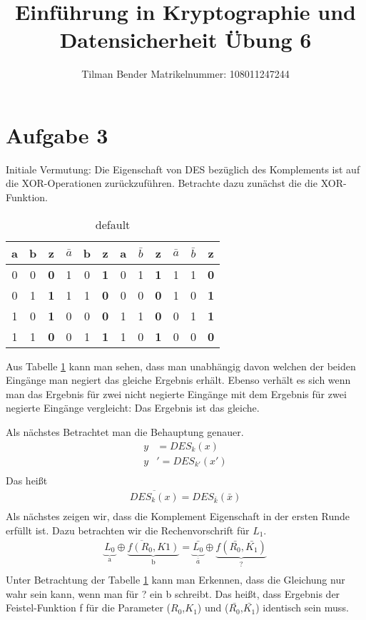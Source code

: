 \documentclass[10pt,a4paper,parskip]{scrartcl}
\author{Tilman Bender   Matrikelnummer: 108011247244\\}
\title{Einführung in Kryptographie und Datensicherheit Übung 6}
\begin{document}
\maketitle

\section*{Aufgabe 3}
Initiale Vermutung: Die Eigenschaft von DES bezüglich des Komplements ist auf die XOR-Operationen zurückzuführen. Betrachte dazu zunächst die  die XOR-Funktion.
\begin{table}[htdp]
\caption{default}
\begin{center}
\begin{tabular}{|c|c|c||c|c|c||c|c|c||c|c|c||}
	a & b & z & $\bar{a}$ & b & z & a & $\bar{b}$ & z & $\bar{a}$ & $\bar{b}$ & z\\ \hline
	0 & 0 & \textbf{0} & 	1 	 & 0 & \textbf{1}  & 0 & 1		  & \textbf{1} & 1		     &	1		& \textbf{0} \\
	0 & 1 & \textbf{1} &	1	& 1 &   \textbf{0} & 0 &	0	    &	 \textbf{0} & 1		     & 0		& \textbf{1}\\	
	1 & 0 & \textbf{1} &	0	& 0 &   \textbf{0} & 1 &	1	    &	 \textbf{0} & 0		     & 1		& \textbf{1}\\	
	1 & 1 & \textbf{0} &	0	& 1 &   \textbf{1} & 1 &	0	    &	 \textbf{1} & 0		     & 0		& \textbf{0}\\	
\end{tabular}
\end{center}
\label{tbl:xor}
\end{table}%
Aus Tabelle \ref{tbl:xor} kann man sehen, dass man unabhängig davon welchen der beiden Eingänge man negiert das gleiche Ergebnis erhält. Ebenso verhält es sich wenn man das Ergebnis für zwei nicht negierte Eingänge mit dem Ergebnis für zwei negierte Eingänge vergleicht: Das Ergebnis ist das gleiche.

Als nächstes Betrachtet man die Behauptung genauer.
\begin{align*}
y&=DES_{k}(x)\\
y&'=DES_{k'}(x')\\
\end{align*}
Das heißt
\begin{align*}
\overline{DES_{k}(x)}=DES_{\bar{k}}(\bar{x})\\
\end{align*}
Als nächstes zeigen wir, dass die Komplement Eigenschaft in der ersten Runde erfüllt ist. Dazu betrachten wir die Rechenvorschrift für $L_{1}$.
\begin{align*}
\overline{\underbrace{L_{0}}_\text{a}\oplus \underbrace{f(R_{0},K1)}_\text{b} }= \underbrace{\bar{L_{0}}}_{\bar{a}} \oplus \underbrace{f(\bar{R_{0}},\bar{K_{1}})}_{?}\\
\end{align*}
Unter Betrachtung der Tabelle \ref{tbl:xor} kann man Erkennen, dass die Gleichung nur wahr sein kann, wenn man für ? ein b schreibt. Das heißt, dass Ergebnis der Feistel-Funktion f für die Parameter ($R_{0}$,$K_{1}$) und ($\bar{R_{0}}$,$\bar{K_{1}}$) identisch sein muss.
\end{document}
